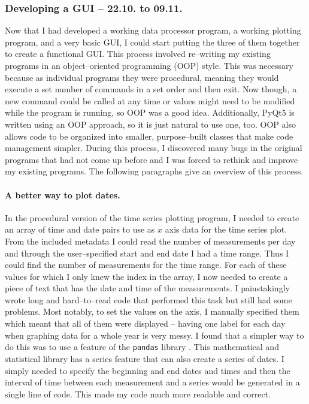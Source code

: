 \documentclass[../00_main.tex]{subfiles}
\begin{document}
\subsubsection{Developing a GUI -- 22.10. to 09.11.}

Now that I had developed a working data processor program, a working
plotting program, and a very basic GUI, I could start putting the three of them
together to create a functional GUI. This process involved
re--writing my existing programs in an object--oriented programming (OOP) style. This was
necessary because as individual programs they were procedural, meaning they
would execute a set number of commands in a set order and then exit. Now 
though, a new command
could be called at any time or values might need to be modified while the
program is running, so OOP was a good idea. Additionally, PyQt5 is written
using an OOP approach, so it is just natural to use one, too. OOP also allows
code to be organized into smaller, purpose--built classes that make code
management simpler. During this process, I discovered many bugs in the original
programs that had not come up before and I was forced to rethink and improve my
existing programs. The following paragraphs give an overview of this process.

\paragraph{A better way to plot dates.} In the procedural version of the time
series plotting program, I needed to create an array of time and date pairs to
use as $x$ axis data for the time series plot. From the included metadata
I could read the number of measurements per day and through the user--specified
start and end date I had a time range. Thus I could find the number of
measurements for the time range. For each of these values for which I only knew
the index in the array, I now needed to create a piece of text that has the
date and time of the measurements. I painstakingly wrote long and hard--to--read
code that performed this task but still had some problems. Most notably, to set
the values on the axis, I manually specified them which meant that all of them
were displayed -- having one label for each day when graphing data for a whole 
year is very messy. I found that a simpler way to do this was to use a feature
of the \texttt{pandas} library \cite{pandas}. This mathematical and statistical library has
a series feature that can also create a series of dates. I simply needed to
specify the beginning and end dates and times and then the interval of time
between each measurement and a series would be generated in a single line of
code. This made my code much more readable and correct. 
\end{document}
